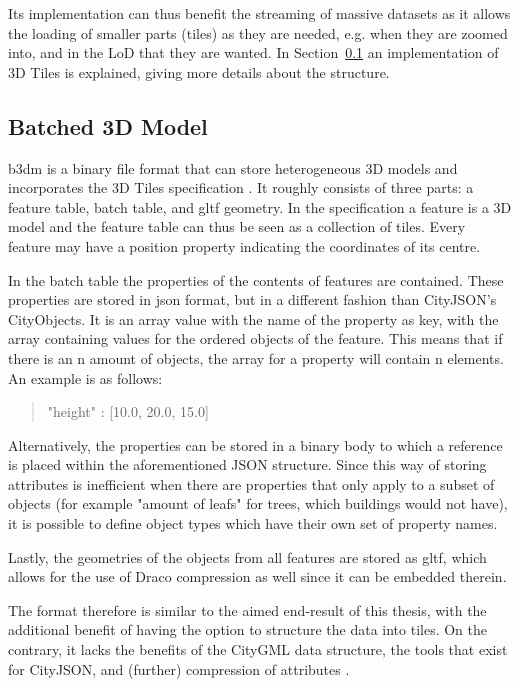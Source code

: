 Its implementation can thus benefit the streaming of massive datasets as it allows the loading of smaller parts (tiles) as they are needed, e.g. when they are zoomed into, and in the LoD that they are wanted.
In Section~\ref{sec:b3dm} an implementation of 3D Tiles is explained, giving more details about the structure.


\subsection{Batched 3D Model}
\label{sec:b3dm}
b3dm is a binary file format that can store heterogeneous 3D models and incorporates the 3D Tiles specification \citep{b3dm}.
It roughly consists of three parts: a feature table, batch table, and \ac{gltf} geometry.
In the specification a feature is a 3D model and the feature table can thus be seen as a collection of tiles.
Every feature may have a position property indicating the coordinates of its centre.

In the batch table the properties of the contents of features are contained.
These properties are stored in \ac{json} format, but in a different fashion than CityJSON's CityObjects. 
It is an array value with the name of the property as key, with the array containing values for the ordered objects of the feature.
This means that if there is an n amount of objects, the array for a property will contain n elements.
An example is as follows:

\blockquote{"height" : [10.0, 20.0, 15.0]}

Alternatively, the properties can be stored in a binary body to which a reference is placed within the aforementioned JSON structure.
Since this way of storing attributes is inefficient when there are properties that only apply to a subset of objects (for example "amount of leafs" for trees, which buildings would not have), it is possible to define object types which have their own set of property names.

Lastly, the geometries of the objects from all features are stored as \ac{gltf}, which allows for the use of Draco compression as well since it can be embedded therein.

The format therefore is similar to the aimed end-result of this thesis, with the additional benefit of having the option to structure the data into tiles.
On the contrary, it lacks the benefits of the CityGML data structure, the tools that exist for CityJSON, and (further) compression of attributes \citep{b3dm}.

